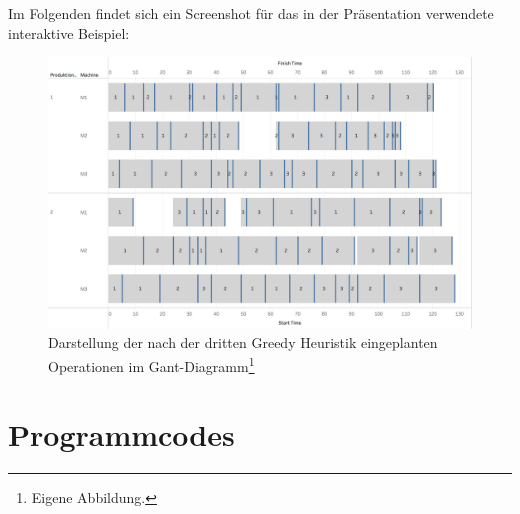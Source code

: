 \documentclass[final, english, ngerman, a4paper, 12pt, %
numbers=noenddot,
cd=true,
cdfont=false,cdfont=nohead,cdfont=nodin,
cdmath=false,
cdhead=false,
cdfoot=true,
cdcover=monochrome,
cdgeometry=symmetric,
declaration=heading,
declaration=notoc,
abstract=heading,
]{tudscrreprt}
\begin{document}
\noindent
Im Folgenden findet sich ein Screenshot für das in der Präsentation verwendete interaktive Beispiel:
\begin{figure}[H]
	\centering
	\includegraphics[width=\textwidth]{./settings/gh3}
	\caption[Interaktives Beispiel - Einplanung nach der dritten Greedy Heuristik]{Darstellung der nach der dritten Greedy Heuristik eingeplanten Operationen im Gant-Diagramm\footnote{Eigene Abbildung.}}\label{fig:gh3}
\end{figure}

\appendix

\chapter{Programmcodes}

\clearpage

\printbibliography

\end{document}
